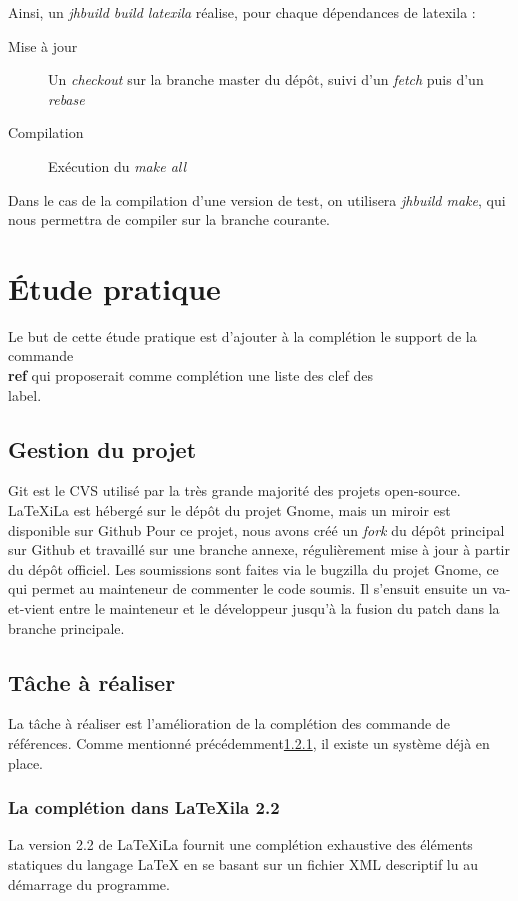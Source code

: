 \documentclass[a4paper,11pt]{report}
\begin{document}
Ainsi, un \textit{jhbuild build latexila} réalise, pour chaque dépendances de latexila :
\begin{description} 
  \item[Mise à jour] Un \textit{checkout} sur la branche master du dépôt, suivi d'un \textit{fetch} puis d'un \textit{rebase} 
  \item[Compilation] Exécution du \textit{make all}
\end{description}

Dans le cas de la compilation d'une version de test, on utilisera \textit{jhbuild make}, qui nous permettra de compiler sur la branche courante.

\chapter{Étude pratique} %
\label{cha:etude_pratique}
Le but de cette étude pratique est d'ajouter à la complétion le support de la commande \textbf{\\ref} qui proposerait comme complétion une liste des clef des \\label. 

\section{Gestion du projet} %
\label{sec:git}
Git est le CVS utilisé par la très grande majorité des projets open-source. LaTeXiLa est hébergé sur le dépôt du projet Gnome, mais un miroir est disponible sur Github %
Pour ce projet, nous avons créé un \textit{fork} du dépôt principal sur Github et travaillé sur une branche annexe, régulièrement mise à jour à partir du dépôt officiel.
Les soumissions sont faites via le bugzilla du projet Gnome, ce qui permet au mainteneur de commenter le code soumis. Il s'ensuit ensuite un va-et-vient entre le mainteneur et le développeur jusqu'à la fusion du patch dans la branche principale.

\section{Tâche à réaliser} %
\label{sec:tache_a_realiser}
La tâche à réaliser est l'amélioration de la complétion des commande de références. Comme mentionné précédemment\ref{sub:completion}, il existe un système déjà en place.


\subsection{La complétion dans LaTeXila 2.2}
\label{sub:completion}
La version 2.2 de LaTeXiLa fournit une complétion exhaustive des éléments statiques du langage LaTeX en se basant sur un fichier XML descriptif lu au démarrage du programme. 
\end{document}
